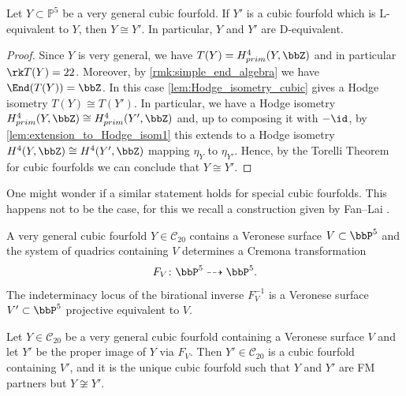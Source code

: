 \documentclass{amsart}
\begin{document}
\begin{theorem}\label{thm:main_very_general_cubic}
   Let \(Y\subset \mathbb{P}^5\) be a very general cubic fourfold. If \(Y'\) is a cubic fourfold which is L-equivalent to \(Y\), then \(Y\cong Y'\). In particular, \(Y\) and \(Y'\) are D-equivalent.
\end{theorem}

\begin{proof}
    Since \(Y\) is very general, we have \(T(Y)=H^4_{prim}(Y,\bbZ)\) and in particular \(\rk T(Y)=22\). Moreover, by \autoref{rmk:simple_end_algebra} we have \(\End(T(Y))=\bbZ\). In this case \autoref{lem:Hodge_isometry_cubic} gives a Hodge isometry \(T(Y)\cong T(Y')\). In particular, we have a Hodge isometry \(H^4_{prim}(Y,\bbZ)\cong H^4_{prim}(Y',\bbZ)\) and, up to composing it with \(-\id\), by \autoref{lem:extension_to_Hodge_isom1} this extends to a Hodge isometry \(H^4(Y,\bbZ)\cong H^4(Y',\bbZ)\) mapping \(\eta_Y\) to \(\eta_{Y'}\). Hence, by the Torelli Theorem for cubic fourfolds \cite{voisin1986theoreme} we can conclude that \(Y\cong Y'\).
\end{proof}

One might wonder if a similar statement holds for special cubic fourfolds. This happens not to be the case, for this we recall a construction given by Fan--Lai \cite{Fan_Lai:New_rational}. 

A very general cubic fourfold \(Y\in \mathcal{C}_{20}\) contains a Veronese surface \(V\subset \bbP^5\) and the system of quadrics containing \(V\) determines a Cremona transformation 
\[F_V\colon \bbP^5\dashrightarrow \bbP^5.\]
The indeterminacy locus of the birational inverse \(F_V^{-1}\) is a Veronese surface \(V'\subset \bbP^5\) projective equivalent to \(V\). 
\begin{proposition}\label{thm:Fan-Lai}
    Let \(Y\in \mathcal{C}_{20}\) be a very general cubic fourfold containing a Veronese surface \(V\) and let \(Y'\) be the proper image of \(Y\) via \(F_V\). Then \(Y'\in \mathcal{C}_{20}\) is a cubic fourfold containing \(V'\), and it is the unique cubic fourfold such that \(Y\) and \(Y'\) are FM partners but \(Y\not\cong Y'\).
\end{proposition}
\end{document}
